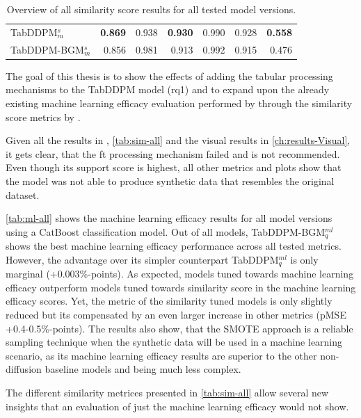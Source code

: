 \begin{table}[h]
\begin{tabular}{lrrrrrr}
		TabDDPM$^{s}_m$      & \textbf{0.869}            & 0.938          & \textbf{0.930}       & 0.990          & 0.928            & \textbf{0.558} \\
		TabDDPM-BGM$^{s}_m$  & 0.856                     & 0.981          & 0.913                & 0.992          & 0.915            & 0.476          \\
		\bottomrule
	\end{tabular}
	\caption[]{Overview of all similarity score results for all tested model versions.}
	\label{tab:sim-all}
\end{table}

The goal of this thesis is to show the effects of adding the tabular processing mechanisms to the TabDDPM model (\gls{rq}1) and 
to expand upon the already existing machine learning efficacy evaluation performed by \cite{kotelnikov2022TabDDPMModellingTabular} through the similarity score metrics by \cite{chundawat2022UniversalMetricRobust}.

Given all the results in , \autoref{tab:sim-all} and the visual results in \autoref{ch:results-Visual}, it gets clear, that the \gls{ft} processing mechanism failed and is not recommended.
Even though its support score is highest, all other metrics and plots show that the model was not able to produce synthetic data that resembles the original dataset.

\autoref{tab:ml-all} shows the machine learning efficacy results for all model versions using a CatBoost classification model.
Out of all models, TabDDPM-BGM$^{ml}_q$ shows the best machine learning efficacy performance across all tested metrics.
However, the advantage over its simpler counterpart TabDDPM$^{ml}_q$ is only marginal (+0.003\%-points).
As expected, models tuned towards machine learning efficacy outperform models tuned towards similarity score in the machine learning efficacy scores.
Yet, the metric of the similarity tuned models is only slightly reduced but its compensated by an even larger increase in other metrics (pMSE +0.4-0.5\%-points).
The results also show, that the SMOTE approach is a reliable sampling technique when the synthetic data will be used in a machine learning scenario, as its machine learning efficacy results 
are superior to the other non-diffusion baseline models and being much less complex.

The different similarity metrices presented in \autoref{tab:sim-all} allow several new insights that an evaluation of just the machine learning efficacy would not show.


